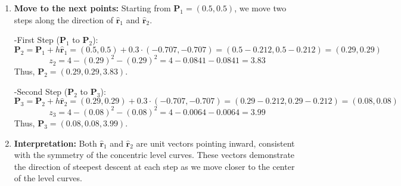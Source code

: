 \begin{example}
\begin{solution}
\begin{enumerate}
    \item \textbf{Move to the next points:}
    Starting from \( \mathbf{P}_1 = (0.5, 0.5) \), we move two steps along the direction of \( \hat{\mathbf{r}}_1 \) and \( \hat{\mathbf{r}}_2 \).

    -First Step (\( \mathbf{P}_1 \) to \( \mathbf{P}_2 \)):
      \[
      \mathbf{P}_2 = \mathbf{P}_1 + h \hat{\mathbf{r}}_1 = (0.5, 0.5) + 0.3 \cdot (-0.707, -0.707) = (0.5 - 0.212, 0.5 - 0.212) = (0.29, 0.29)
      \]
      \[
      z_2 = 4 - (0.29)^2 - (0.29)^2 = 4 - 0.0841 - 0.0841 = 3.83
      \]
      Thus, \( \mathbf{P}_2 = (0.29, 0.29, 3.83) \).

    -Second Step (\( \mathbf{P}_2 \) to \( \mathbf{P}_3 \)):
      \[
      \mathbf{P}_3 = \mathbf{P}_2 + h \hat{\mathbf{r}}_2 = (0.29, 0.29) + 0.3 \cdot (-0.707, -0.707) = (0.29 - 0.212, 0.29 - 0.212) = (0.08, 0.08)
      \]
      \[
      z_3 = 4 - (0.08)^2 - (0.08)^2 = 4 - 0.0064 - 0.0064 = 3.99
      \]
      Thus, \( \mathbf{P}_3 = (0.08, 0.08, 3.99) \).

    \item \textbf{Interpretation:}
    Both \( \hat{\mathbf{r}}_1 \) and \( \hat{\mathbf{r}}_2 \) are unit vectors pointing inward, consistent with the symmetry of the concentric level curves. These vectors demonstrate the direction of steepest descent at each step as we move closer to the center of the level curves.
\end{enumerate}

\begin{figure}[H]
\centering
{}
\end{figure}
\end{solution}
\end{example}
